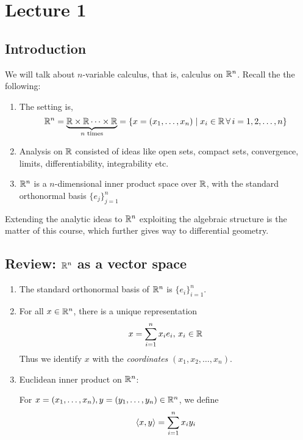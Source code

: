 \documentclass[../Analysis-3.tex]{subfiles}
\begin{document}
\chapter*{Lecture 1} %
\setcounter{chapter}{1} %
\setcounter{section}{0}

\section{Introduction}
We will talk about $ n $-variable calculus, that is, calculus on $ \mathbb{R}^n $. Recall the the following:
\begin{enumerate}[label = $\bullet$]
  \item The setting is,
        \[ \mathbb{R}^n = \underbrace{\mathbb{R} \times \mathbb{R} \cdots \times \mathbb{R}}_{n \text{ times}} = \{x = (x_1, \dots, x_n) \mid x_i \in \mathbb{R} \, \forall \, i = 1,2, \dots, n\} \]
  \item Analysis on $ \mathbb{R} $ consisted of ideas like open sets, compact sets, convergence, limits, differentiability, integrability etc.
  \item $ \mathbb{R}^n $ is a $ n $-dimensional inner product space over $ \mathbb{R} $, with the standard orthonormal basis $ \{e_j\}_{j=1}^n $
\end{enumerate}

Extending the analytic ideas to $ \mathbb{R}^n $ exploiting the algebraic structure is the matter of this course, which further gives way to differential geometry.

\section{Review: $ \mathbb{R}^n $ as a vector space}

\begin{enumerate}[label = (\roman*)]
  \item The standard orthonormal basis of $ \mathbb{R}^n $ is $ \{e_i\}_{i=1}^n $.
  \item For all $ x \in \mathbb{R}^n $, there is a unique representation
        \[ x = \sum_{i=1}^n x_i e_i, \, x_i \in \mathbb{R} \]
        Thus we identify $ x $ with the \textit{coordinates} $ (x_1,x_2, \dots, x_n) $.
  \item Euclidean inner product on $ \mathbb{R}^n $:

        For $ x = (x_1, \dots, x_n), y = (y_1, \dots, y_n) \in \mathbb{R}^n $, we define
        \[ \left\langle {x}, {y} \right\rangle = \sum_{i=1}^{n} x_iy_i \]
\end{enumerate}
\end{document}
